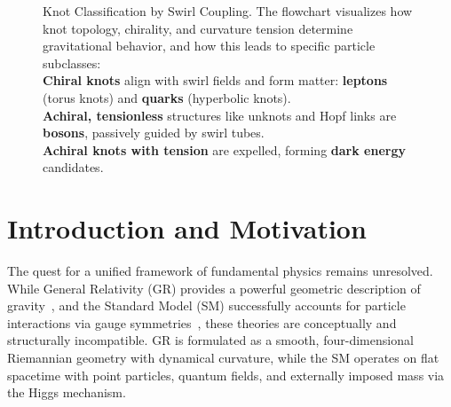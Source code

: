\documentclass[12pt]{article}
\begin{document}
\begin{figure}[H]
{
            }
            \caption{Knot Classification by Swirl Coupling.
                The flowchart visualizes how knot topology, chirality, and curvature tension determine gravitational behavior, and how this leads to specific particle subclasses:
                    \\ \textbf{Chiral knots} align with swirl fields and form matter: \textbf{leptons} (torus knots) and \textbf{quarks} (hyperbolic knots).
                    \\ \textbf{Achiral, tensionless} structures like unknots and Hopf links are \textbf{bosons}, passively guided by swirl tubes.
                    \\ \textbf{Achiral knots with tension} are expelled, forming \textbf{dark energy} candidates.
            }\label{fig:knot-classification}
        \end{figure}
    \titlepageClose

    \tableofcontents
    \newpage
\section{Introduction and Motivation}

    The quest for a unified framework of fundamental physics remains unresolved. While General Relativity (GR) provides a powerful geometric description of gravity~\cite{einstein1915gr}, and the Standard Model (SM) successfully accounts for particle interactions via gauge symmetries~\cite{weinberg1995quantum}, these theories are conceptually and structurally incompatible. GR is formulated as a smooth, four-dimensional Riemannian geometry with dynamical curvature, while the SM operates on flat spacetime with point particles, quantum fields, and externally imposed mass via the Higgs mechanism.
\end{document}
